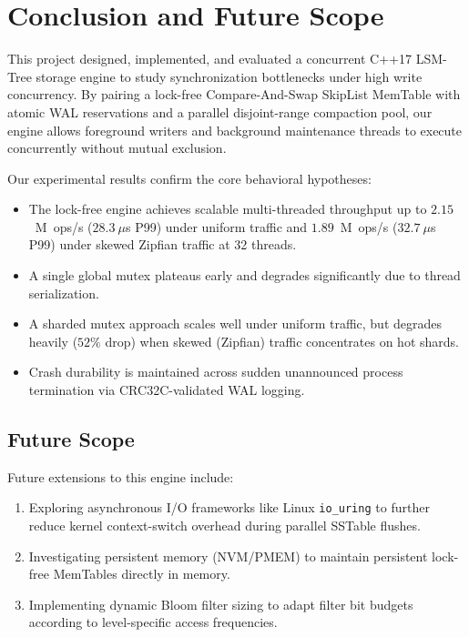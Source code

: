 \documentclass[conference]{IEEEtran}
\begin{document}
\section{Conclusion and Future Scope}
This project designed, implemented, and evaluated a concurrent C++17 LSM-Tree storage engine to study synchronization bottlenecks under high write concurrency. By pairing a lock-free Compare-And-Swap SkipList MemTable with atomic WAL reservations and a parallel disjoint-range compaction pool, our engine allows foreground writers and background maintenance threads to execute concurrently without mutual exclusion.

Our experimental results confirm the core behavioral hypotheses:
\begin{itemize}
    \item The lock-free engine achieves scalable multi-threaded throughput up to $2.15$~M~ops/s ($28.3~\mu$s P99) under uniform traffic and $1.89$~M~ops/s ($32.7~\mu$s P99) under skewed Zipfian traffic at 32 threads.
    \item A single global mutex plateaus early and degrades significantly due to thread serialization.
    \item A sharded mutex approach scales well under uniform traffic, but degrades heavily ($52\%$ drop) when skewed (Zipfian) traffic concentrates on hot shards.
    \item Crash durability is maintained across sudden unannounced process termination via CRC32C-validated WAL logging.
\end{itemize}

\subsection{Future Scope}
Future extensions to this engine include:
\begin{enumerate}
    \item Exploring asynchronous I/O frameworks like Linux \texttt{io\_uring} to further reduce kernel context-switch overhead during parallel SSTable flushes.
    \item Investigating persistent memory (NVM/PMEM) to maintain persistent lock-free MemTables directly in memory.
    \item Implementing dynamic Bloom filter sizing to adapt filter bit budgets according to level-specific access frequencies.
\end{enumerate}
\end{document}

